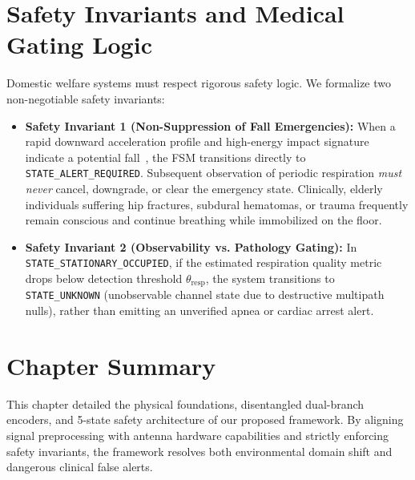 \section{Safety Invariants and Medical Gating Logic}
Domestic welfare systems must respect rigorous safety logic. We formalize two non-negotiable safety invariants:
\begin{itemize}
    \item \textbf{Safety Invariant 1 (Non-Suppression of Fall Emergencies):} When a rapid downward acceleration profile and high-energy impact signature indicate a potential fall~\cite{wang2017rt}, the FSM transitions directly to \texttt{STATE\_ALERT\_REQUIRED}. Subsequent observation of periodic respiration \emph{must never} cancel, downgrade, or clear the emergency state. Clinically, elderly individuals suffering hip fractures, subdural hematomas, or trauma frequently remain conscious and continue breathing while immobilized on the floor.
    \item \textbf{Safety Invariant 2 (Observability vs. Pathology Gating):} In \texttt{STATE\_STATIONARY\_OCCUPIED}, if the estimated respiration quality metric drops below detection threshold $\theta_{\text{resp}}$, the system transitions to \texttt{STATE\_UNKNOWN} (unobservable channel state due to destructive multipath nulls), rather than emitting an unverified apnea or cardiac arrest alert.
\end{itemize}

\section{Chapter Summary}
This chapter detailed the physical foundations, disentangled dual-branch encoders, and 5-state safety architecture of our proposed framework. By aligning signal preprocessing with antenna hardware capabilities and strictly enforcing safety invariants, the framework resolves both environmental domain shift and dangerous clinical false alerts.
